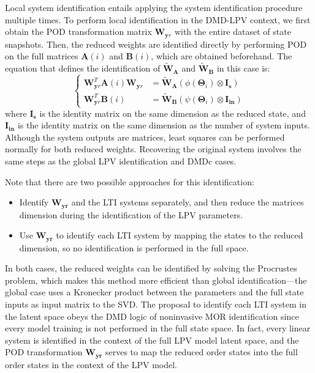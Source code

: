 Local system identification entails applying the system identification procedure multiple times.
%
 To perform local identification in the DMD-LPV context, we first obtain the POD transformation matrix $\mathbf{W}_{\mathbf{y}r}$ with the entire dataset of state snapshots.
%
Then, the reduced weights are identified directly by performing POD on the full matrices $\mathbf{A}(i)$ and $\mathbf{B}(i)$, which are obtained beforehand.
%
The equation that defines the identification of $\widetilde{\mathbf{W}}_{\mathbf{A}}$ and $\widetilde{\mathbf{W}}_{\mathbf{B}}$ in this case is:
   \begin{equation}
   \left \{
\begin{aligned} \label{eqn:local_dmdlpv}
     \mathbf{W}_{\mathbf{y}r}^T\mathbf{A}(i)\mathbf{W}_{\mathbf{y}r} &=\widetilde{\mathbf{W}}_{\mathbf{A}}(\phi(\boldsymbol{\Theta}_i) \otimes \mathbf{I_s})\\
     \mathbf{W}_{\mathbf{y}r}^T\mathbf{B}(i) &=\widetilde{\mathbf{W}}_{\mathbf{B}}(\psi(\boldsymbol{\Theta}_i) \otimes \mathbf{I_{in}})
\end{aligned}
 \right .
\end{equation}
where $\mathbf{I_s}$ is the identity matrix on the same dimension as the reduced state, and $\mathbf{I_{in}}$ is the identity matrix on the same dimension as the number of system inputs.
%
Although the system outputs are matrices, least squares can be performed normally for both reduced weights.
%
Recovering the original system involves the same steps as the global LPV identification and DMDc cases.

Note that there are two possible approaches for this identification:
\begin{itemize}
    \item Identify $\mathbf{W_{yr}}$ and the LTI systems separately, and then reduce the matrices dimension during the identification of the LPV parameters.
    \item Use $\mathbf{W_{yr}}$ to identify each LTI system by mapping the states to the reduced dimension, so no identification is performed in the full space.
\end{itemize}

In both cases, the reduced weights can be identified by solving the Procrustes problem, which makes this method more efficient than global identi\-fi\-cation---the global case uses a Kronecker product between the parameters and the full state inputs as input matrix to the SVD.
%
The proposal to identify each LTI system in the latent space obeys the DMD logic of noninvasive MOR identification since every model training is not performed in the full state space.
%
In fact, every linear system is identified in the context of the full LPV model latent space, and the POD transformation $\mathbf{W_{yr}}$ serves to map the reduced order states into the full order states in the context of the LPV model.



